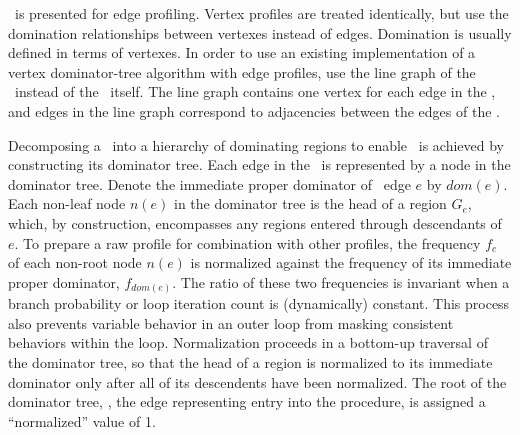 \HN\ is presented for edge profiling.  Vertex profiles are treated
identically, but use the domination relationships between vertexes
instead of edges.  Domination is usually defined in terms of vertexes.
In order to use an existing implementation of a vertex dominator-tree
algorithm with edge profiles, use the line graph of the \CFG\ instead of
the \CFG\ itself.  The line graph contains one vertex for each edge in
the \CFG, and edges in the line graph correspond to adjacencies
between the edges of the \CFG.

Decomposing a \CFG\ into a hierarchy of dominating regions to enable
\HN\ is achieved by constructing its dominator tree. Each edge in the
\CFG\ is represented by a node in the dominator tree.  Denote the
immediate proper dominator of \CFG\ edge $e$ by $dom(e)$.  Each non-leaf
node $n(e)$ in the dominator tree is the head of a region $G_e$, which,
by construction, encompasses any regions entered through descendants of
$e$.  To prepare a raw profile for combination with other profiles,
the frequency $f_e$ of each non-root node $n(e)$ is normalized against
the frequency of its immediate proper dominator, $f_{dom(e)}$.
The ratio of these two frequencies is invariant when a branch
probability or loop iteration count is (dynamically) constant.
This process also prevents variable behavior in an outer loop from masking
consistent behaviors within the loop.  Normalization proceeds in a
bottom-up traversal of the dominator tree, so that the head of a
region is normalized to its immediate dominator only after all of its
descendents have been normalized.  The root of the dominator tree,
\ie, the edge representing entry into the procedure, is assigned a
``normalized'' value of 1.



